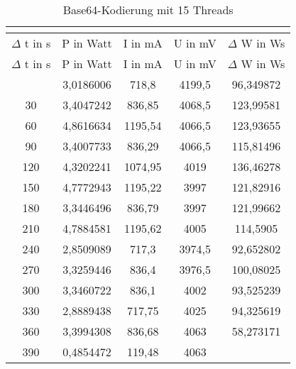 
\begin{longtable}[c]{ccccc}
\caption{Base64-Kodierung mit 15 Threads} \\
\label{tab:Base64MessungThreadFuenfzehn}\\
\hline
{$\Delta$ t in s} & {P in Watt} & {I in mA} & {U in mV} & {$\Delta$ W in Ws} \\
\hline
\endfirsthead
\hline
$\Delta$ t in s & P in Watt & I in mA & U in mV & $\Delta$ W in Ws \\
\hline
\endhead
\hline
\endfoot
\hline
   \midrule
    0     & 3,0186006 & 718,8 & 4199,5 & 96,349872 \\
    \midrule
    30    & 3,4047242 & 836,85 & 4068,5 & 123,99581 \\
    \midrule
    60    & 4,8616634 & 1195,54 & 4066,5 & 123,93655 \\
    \midrule
    90    & 3,4007733 & 836,29 & 4066,5 & 115,81496 \\
    \midrule
    120   & 4,3202241 & 1074,95 & 4019  & 136,46278 \\
    \midrule
    150   & 4,7772943 & 1195,22 & 3997  & 121,82916 \\
    \midrule
    180   & 3,3446496 & 836,79 & 3997  & 121,99662 \\
    \midrule
    210   & 4,7884581 & 1195,62 & 4005  & 114,5905 \\
    \midrule
    240   & 2,8509089 & 717,3 & 3974,5 & 92,652802 \\
    \midrule
    270   & 3,3259446 & 836,4 & 3976,5 & 100,08025 \\
    \midrule
    300   & 3,3460722 & 836,1 & 4002  & 93,525239 \\
    \midrule
    330   & 2,8889438 & 717,75 & 4025  & 94,325619 \\
    \midrule
    360   & 3,3994308 & 836,68 & 4063  & 58,273171 \\
    \midrule
    390   & 0,4854472 & 119,48 & 4063  &  \\
\end{longtable}

